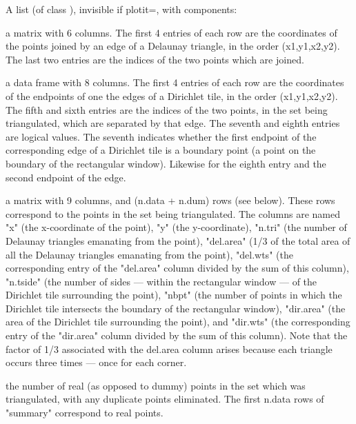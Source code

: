 \begin{Value}
A list (of class ), invisible if plotit=, with components:

\begin{ldescription}
\item[\code{delsgs}] a matrix with 6 columns.  The first 4 entries of each row are the
coordinates of the points joined by an edge of a Delaunay
triangle, in the order (x1,y1,x2,y2).  The last two entries are the
indices of the two points which are joined.

\item[\code{dirsgs}] a data frame with 8 columns.  The first 4 entries of each row are the
coordinates of the endpoints of one the edges of a Dirichlet tile, in
the order (x1,y1,x2,y2).  The fifth and sixth entries are the indices
of the two points, in the set being triangulated, which are separated
by that edge. The seventh and eighth entries are logical values.  The
seventh indicates whether the first endpoint of the corresponding
edge of a Dirichlet tile is a boundary point (a point on the boundary
of the rectangular window).  Likewise for the eighth entry and the
second endpoint of the edge.

\item[\code{summary}] a matrix with 9 columns, and (n.data + n.dum) rows (see below).
These rows correspond to the points in the set being triangulated.
The columns are named "x" (the x-coordinate of the point), "y" (the
y-coordinate), "n.tri" (the number of Delaunay triangles emanating
from the point), "del.area" (1/3 of the total area of all the
Delaunay triangles emanating from the point), "del.wts" (the
corresponding entry of the "del.area" column divided by the sum of
this column), "n.tside" (the number of sides --- within the
rectangular window --- of the Dirichlet tile surrounding the point),
"nbpt" (the number of points in which the Dirichlet tile intersects
the boundary of the rectangular window), "dir.area" (the area of the
Dirichlet tile surrounding the point), and "dir.wts" (the
corresponding entry of the "dir.area" column divided by the sum of
this column).  Note that the factor of 1/3 associated with the
del.area column arises because each triangle occurs three times ---
once for each corner.

\item[\code{n.data}] the number of real (as opposed to dummy) points in the set which was
triangulated, with any duplicate points eliminated.  The first n.data
rows of "summary" correspond to real points.


\end{ldescription}
\end{Value}
